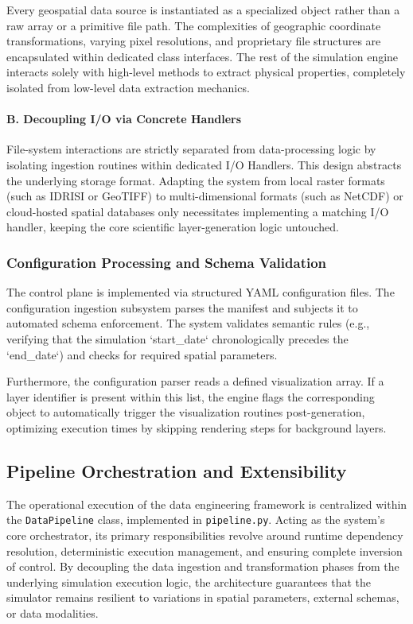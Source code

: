 Every geospatial data source is instantiated as a specialized object rather than a raw array or a primitive file path. The complexities 
of geographic coordinate transformations, varying pixel resolutions, and proprietary file structures are encapsulated within dedicated 
class interfaces. The rest of the simulation engine interacts solely with high-level methods to extract physical properties, completely 
isolated from low-level data extraction mechanics.

\paragraph{B. Decoupling I/O via Concrete Handlers}

File-system interactions are strictly separated from data-processing logic by isolating ingestion routines within dedicated I/O Handlers. 
This design abstracts the underlying storage format. Adapting the system from local raster formats (such as IDRISI or GeoTIFF) to 
multi-dimensional formats (such as NetCDF) or cloud-hosted spatial databases only necessitates implementing a matching I/O handler, 
keeping the core scientific layer-generation logic untouched.


\subsubsection{Configuration Processing and Schema Validation}

The control plane is implemented via structured YAML configuration files. The configuration ingestion subsystem parses the manifest and 
subjects it to automated schema enforcement. The system validates semantic rules (e.g., verifying that the simulation `start\_date` 
chronologically precedes the `end\_date`) and checks for required spatial parameters. 

Furthermore, the configuration parser reads a defined visualization array. If a layer identifier is present within this list, the engine 
flags the corresponding object to automatically trigger the visualization routines post-generation, optimizing execution times by skipping 
rendering steps for background layers.


\subsection{Pipeline Orchestration and Extensibility}
\label{subsec:pipeline_orchestrator}

The operational execution of the data engineering framework is centralized within the \texttt{DataPipeline} class, implemented in 
\texttt{pipeline.py}. Acting as the system's core orchestrator, its primary responsibilities revolve around runtime dependency resolution, 
deterministic execution management, and ensuring complete inversion of control. By decoupling the data ingestion and transformation phases 
from the underlying simulation execution logic, the architecture guarantees that the simulator remains resilient to variations in spatial 
parameters, external schemas, or data modalities.

